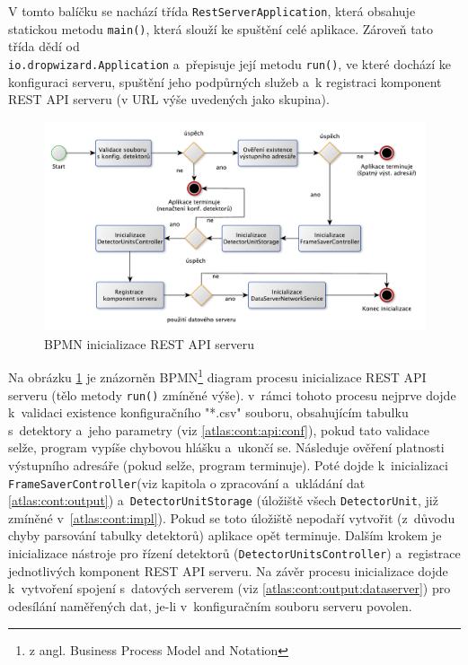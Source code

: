 V tomto balíčku se nachází třída \texttt{RestServerApplication}, která obsahuje statickou metodu \texttt{main()}, která slouží ke spuštění celé aplikace. Zároveň tato třída dědí od \\\texttt{io.dropwizard.Application} a~přepisuje její metodu \texttt{run()}, ve které dochází ke konfiguraci serveru, spuštění jeho podpůrných služeb a~k registraci komponent REST API serveru (v URL výše uvedených jako skupina).

\begin{figure}[th]
	\begin{center}
		\includegraphics[width=15cm]{figures/atlas_tpx_api_server_init.pdf}
		\caption{BPMN inicializace REST API serveru}
		\label{fig:atlas:apiserver-init}
	\end{center}
\end{figure}

Na obrázku \ref{fig:atlas:apiserver-init} je znázorněn BPMN\footnote{z angl. Business Process Model and Notation} diagram procesu inicializace REST API serveru (tělo metody \texttt{run()} zmíněné výše). v~rámci tohoto procesu nejprve dojde k~validaci existence konfiguračního "*.csv" souboru, obsahujícím tabulku s~detektory a~jeho parametry (viz \ref{atlas:cont:api:conf}), pokud tato validace selže, program vypíše chybovou hlášku a~ukončí se.  Následuje ověření platnosti výstupního adresáře (pokud selže, program terminuje). Poté dojde k~inicializaci \texttt{FrameSaverController}(viz kapitola o zpracování a~ukládání dat \ref{atlas:cont:output}) a~\texttt{DetectorUnitStorage} (úložiště všech \texttt{DetectorUnit}, již zmíněné v~\ref{atlas:cont:impl}). Pokud se toto úložiště nepodaří vytvořit (z~důvodu chyby parsování tabulky detektorů) aplikace opět terminuje. Dalším krokem je inicializace nástroje pro řízení detektorů (\texttt{DetectorUnitsController}) a~registrace jednotlivých komponent REST API serveru. Na závěr procesu inicializace dojde k~vytvoření spojení s~datových serverem (viz \ref{atlas:cont:output:dataserver}) pro odesílání naměřených dat, je-li v~konfiguračním souboru serveru povolen. 

